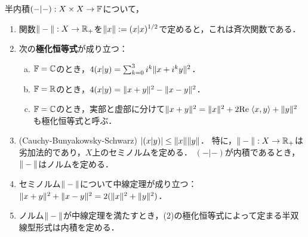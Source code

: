 \documentclass[uplatex,dvipdfmx]{jsreport}
\begin{document}
\begin{proposition}\label{prop-polarization-identity}
    半内積$(-|-):X\times X\to\mathbb{F}$について，
    \begin{enumerate}
        \item 関数$\|-\|:X\to\mathbb{R}_+$を$\|x\|:=(x|x)^{1/2}$で定めると，これは斉次関数である．
        \item 次の\textbf{極化恒等式}が成り立つ：
        \begin{enumerate}[(a)]
            \item $\mathbb{F}=\mathbb{C}$のとき，$4(x|y)=\sum^3_{k=0}i^k\|x+i^ky\|^2$．
            \item $\mathbb{F}=\mathbb{R}$のとき，$4(x|y)=\|x+y\|^2-\|x-y\|^2$．
            \item $\mathbb{F}=\mathbb{C}$のとき，実部と虚部に分けて$\|x+y\|^2=\|x\|^2+2\mathrm{Re}\;\langle x,y\rangle+\|y\|^2$も極化恒等式と呼ぶ．
        \end{enumerate}
        \item (Cauchy-Bunyakowsky-Schwarz) $\lvert(x|y)\rvert\le\|x\|\|y\|$．
        特に，$\|-\|:X\to\mathbb{R}_+$は劣加法的であり，$X$上のセミノルムを定める．
        $(-|-)$が内積であるとき，$\|-\|$はノルムを定める．
        \item セミノルム$\|-\|$について中線定理が成り立つ：$\|x+y\|^2+\|x-y\|^2=2(\|x\|^2+\|y\|^2)$．
        \item ノルム$\|-\|$が中線定理を満たすとき，(2)の極化恒等式によって定まる半双線型形式は内積を定める．
    \end{enumerate}
\end{proposition}
\end{document}
